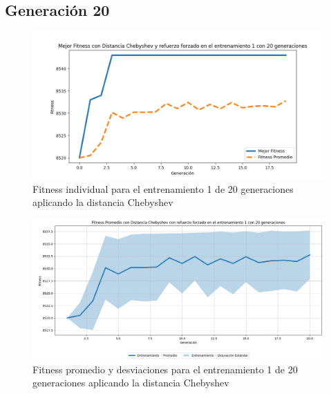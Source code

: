 \documentclass[lettersize, journal]{IEEEtran}
\begin{document}
\subsection{Generación 20}
\setcounter{figure}{0}
\renewcommand{\thefigure}{S\arabic{figure}C-C}

\begin{figure}[H]
    \centering
    \includegraphics[width=0.9 \linewidth]{Chebyshev/Fitness_individual_20Gen/Fitness_1_Cheby_20Gen.png}
    \caption{Fitness individual para el entrenamiento 1 de 20 generaciones aplicando la distancia Chebyshev}
    \label{fig:cheb_1_20}
\end{figure}
\begin{figure}[H]
    \centering
    \includegraphics[width=0.9 \linewidth]{Chebyshev/Fitness_individual_20Gen/Fitness_1_Cheby_20Gen_Sombra.png}
    \caption{Fitness promedio y desviaciones para el entrenamiento 1 de 20 generaciones aplicando la distancia Chebyshev}
    \label{fig:cheb_1_20_sombra}
\end{figure}
\end{document}
